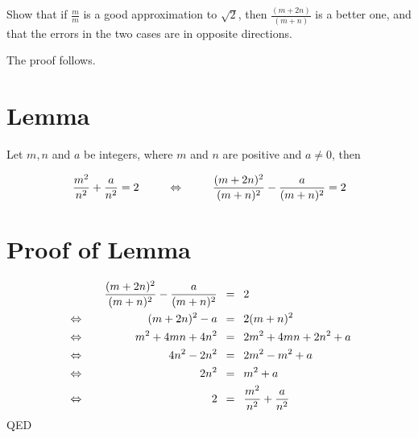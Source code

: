 \documentclass{article}
\begin{document}
Show that if $\frac{m}{m}$ is a good approximation to $\sqrt{2}$, then 
$\frac{(m+2n)}{(m+n)}$ is a better one, and that the errors in the 
two cases are in opposite directions.

\bigskip
The proof follows.

\section*{Lemma}

Let \(m, n\) and \(a\) be integers, where \(m\) and \(n\) are positive and \(a \ne{} 0\), then

\[\frac{m^2}{n^2}+\frac{a}{n^2}=2 \text{\hspace{2.5em}} \Leftrightarrow \text{\hspace{2.5em}}\frac{(m+2n)^2}{(m+n)^2}-\frac{a}{(m+n)^2}=2\]

\section*{Proof of Lemma}

\begin{alignat*}{2}
  &&\frac{(m+2n)^2}{(m+n)^2}-\frac{a}{(m+n)^2}
  \text{\hspace{0.5em}}&=\text{\hspace{0.5em}}
  2\\
  &\Leftrightarrow\quad
  &(m+2n)^2 - a
  \text{\hspace{0.5em}}&=\text{\hspace{0.5em}}
  2(m+n)^2\\
  &\Leftrightarrow\quad
  &m^2 + 4mn + 4n^2
  \text{\hspace{0.5em}}&=\text{\hspace{0.5em}}
  2m^2 + 4mn + 2n^2 + a\\
  &\Leftrightarrow\quad
  &4n^2 - 2n^2
  \text{\hspace{0.5em}}&=\text{\hspace{0.5em}}
  2m^2 - m^2 + a\\
  &\Leftrightarrow\quad
  &2n^2
  \text{\hspace{0.5em}}&=\text{\hspace{0.5em}}
  m^2 + a\\
  &\Leftrightarrow\quad
  &2
  \text{\hspace{0.5em}}&=\text{\hspace{0.5em}}
  \frac{m^2}{n^2}+\frac{a}{n^2}\\
\end{alignat*}
\hspace*{\fill}QED
\end{document}
